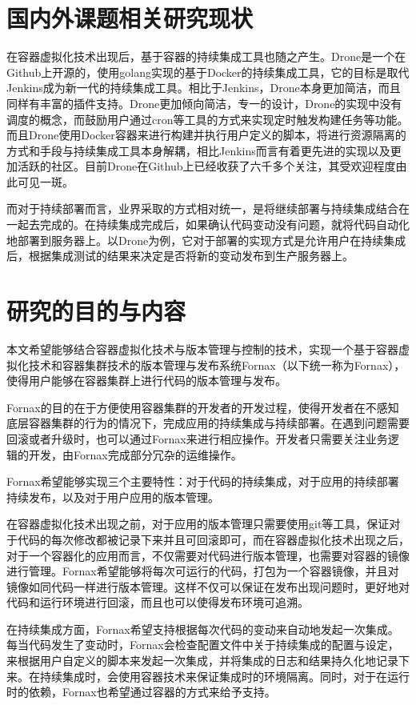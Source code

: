 \section{国内外课题相关研究现状}

在容器虚拟化技术出现后，基于容器的持续集成工具也随之产生。Drone是一个在Github上开源的，使用golang实现的基于Docker的持续集成工具，它的目标是取代Jenkins成为新一代的持续集成工具。相比于Jenkins，Drone本身更加简洁，而且同样有丰富的插件支持。Drone更加倾向简洁，专一的设计，Drone的实现中没有调度的概念，而鼓励用户通过cron等工具的方式来实现定时触发构建任务等功能。而且Drone使用Docker容器来进行构建并执行用户定义的脚本，将进行资源隔离的方式和手段与持续集成工具本身解耦，相比Jenkins而言有着更先进的实现以及更加活跃的社区。目前Drone在Github上已经收获了六千多个关注，其受欢迎程度由此可见一斑。

而对于持续部署而言，业界采取的方式相对统一，是将继续部署与持续集成结合在一起去完成的。在持续集成完成后，如果确认代码变动没有问题，就将代码自动化地部署到服务器上。以Drone为例，它对于部署的实现方式是允许用户在持续集成后，根据集成测试的结果来决定是否将新的变动发布到生产服务器上。

\section{研究的目的与内容}

本文希望能够结合容器虚拟化技术与版本管理与控制的技术，实现一个基于容器虚拟化技术和容器集群技术的版本管理与发布系统Fornax（以下统一称为Fornax），使得用户能够在容器集群上进行代码的版本管理与发布。

Fornax的目的在于方便使用容器集群的开发者的开发过程，使得开发者在不感知底层容器集群的行为的情况下，完成应用的持续集成与持续部署。在遇到问题需要回滚或者升级时，也可以通过Fornax来进行相应操作。开发者只需要关注业务逻辑的开发，由Fornax完成部分冗杂的运维操作。

Fornax希望能够实现三个主要特性：对于代码的持续集成，对于应用的持续部署持续发布，以及对于用户应用的版本管理。

在容器虚拟化技术出现之前，对于应用的版本管理只需要使用git等工具，保证对于代码的每次修改都被记录下来并且可回滚即可，而在容器虚拟化技术出现之后，对于一个容器化的应用而言，不仅需要对代码进行版本管理，也需要对容器的镜像进行管理。Fornax希望能够将每次可运行的代码，打包为一个容器镜像，并且对镜像如同代码一样进行版本管理。这样不仅可以保证在发布出现问题时，更好地对代码和运行环境进行回滚，而且也可以使得发布环境可追溯。

在持续集成方面，Fornax希望支持根据每次代码的变动来自动地发起一次集成。每当代码发生了变动时，Fornax会检查配置文件中关于持续集成的配置与设定，来根据用户自定义的脚本来发起一次集成，并将集成的日志和结果持久化地记录下来。在持续集成时，会使用容器技术来保证集成时的环境隔离。同时，对于在运行时的依赖，Fornax也希望通过容器的方式来给予支持。\cite{wangfei, zhangjian}

